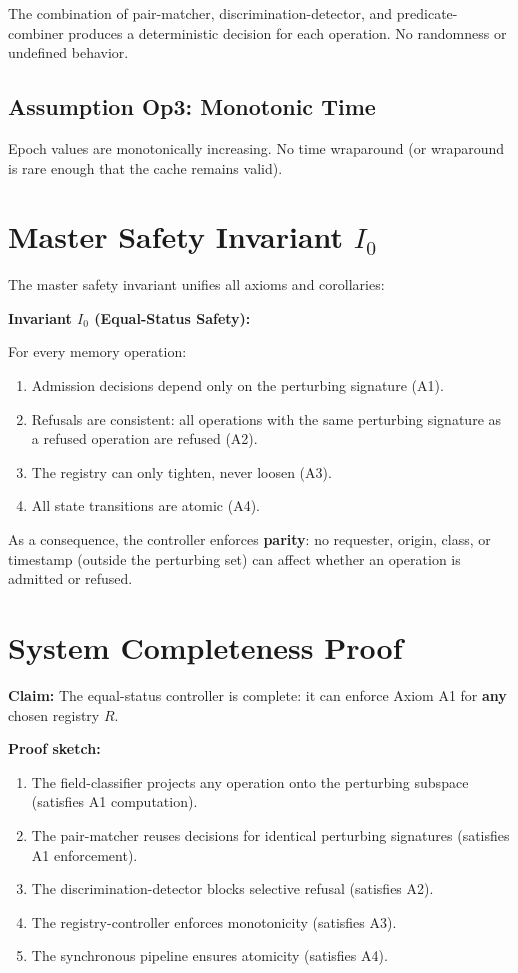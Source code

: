 \documentclass[11pt,oneside]{article}
\begin{document}
The combination of pair-matcher, discrimination-detector, and predicate-combiner produces a deterministic decision for each operation. No randomness or undefined behavior.

\subsection{Assumption Op3: Monotonic Time}

Epoch values are monotonically increasing. No time wraparound (or wraparound is rare enough that the cache remains valid).

\section{Master Safety Invariant $I_0$}

The master safety invariant unifies all axioms and corollaries:

\begin{boxed}
\textbf{Invariant $I_0$ (Equal-Status Safety):}

For every memory operation:
\begin{enumerate}
\item Admission decisions depend only on the perturbing signature (A1).
\item Refusals are consistent: all operations with the same perturbing signature as a refused operation are refused (A2).
\item The registry can only tighten, never loosen (A3).
\item All state transitions are atomic (A4).
\end{enumerate}

As a consequence, the controller enforces \textbf{parity}: no requester, origin, class, or timestamp (outside the perturbing set) can affect whether an operation is admitted or refused.
\end{boxed}

\section{System Completeness Proof}

\textbf{Claim:} The equal-status controller is complete: it can enforce Axiom A1 for \textbf{any} chosen registry $R$.

\textbf{Proof sketch:}
\begin{enumerate}
\item The field-classifier projects any operation onto the perturbing subspace (satisfies A1 computation).
\item The pair-matcher reuses decisions for identical perturbing signatures (satisfies A1 enforcement).
\item The discrimination-detector blocks selective refusal (satisfies A2).
\item The registry-controller enforces monotonicity (satisfies A3).
\item The synchronous pipeline ensures atomicity (satisfies A4).
\end{enumerate}
\end{document}
